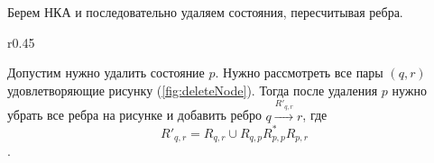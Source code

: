Берем НКА и последовательно удаляем состояния, пересчитывая ребра.

\begin{wrapfigure}{r}{0.45\textwidth}
  \centering
  \caption{Удаление состояния.}
  \label{fig:deleteNode}
\end{wrapfigure}


Допустим нужно удалить состояние $p$. Нужно рассмотреть все пары $(q, r)$ удовлетворяющие
рисунку (\ref{fig:deleteNode}).
Тогда после удаления $p$ нужно убрать все ребра на рисунке и добавить ребро $q\xrightarrow{R'_{q, r}}r$, где $$R'_{q,r}=R_{q,r}\cup R_{q,p}R^*_{p,p}R_{p,r}$$.
